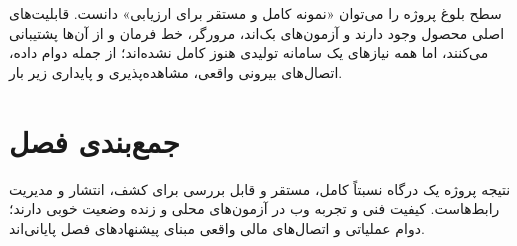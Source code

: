 سطح بلوغ پروژه را می‌توان «نمونه کامل و مستقر برای ارزیابی» دانست. قابلیت‌های اصلی محصول وجود دارند و آزمون‌های بک‌اند، مرورگر، خط فرمان و  از آن‌ها پشتیبانی می‌کنند، اما همه نیازهای یک سامانه تولیدی هنوز کامل نشده‌اند؛ از جمله دوام داده، اتصال‌های بیرونی واقعی، مشاهده‌پذیری و پایداری زیر بار.

\section{جمع‌بندی فصل}
نتیجه پروژه یک درگاه نسبتاً کامل، مستقر و قابل بررسی برای کشف، انتشار و مدیریت رابط‌هاست. کیفیت فنی و تجربه وب در آزمون‌های محلی و زنده وضعیت خوبی دارند؛ دوام عملیاتی و اتصال‌های مالی واقعی مبنای پیشنهادهای فصل پایانی‌اند.
